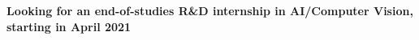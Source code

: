 %
%
%
\par{
    \begin{center}
        \textbf{Looking for an end-of-studies R\&D internship in AI/Computer Vision, starting in April 2021}
    \end{center}
}